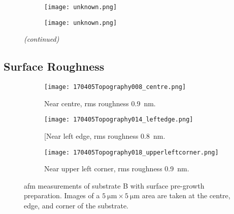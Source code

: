 \begin{figure}[htbp]
\ContinuedFloat
    \centering
    \begin{subfigure}[t]{\textwidth}
          \begin{minipage}[t]{0.49\linewidth}
            \centering
            \texttt{[image: unknown.png]}
          \end{minipage}
          \hspace{0.02\linewidth}
          \begin{minipage}[t]{0.49\linewidth}
            \centering
            \texttt{[image: unknown.png]}
          \end{minipage}
        \caption{}\label{fig:add_label}
    \end{subfigure}
    \captionsetup{list=no}
    \caption{\emph{(continued)}}
\end{figure}



\subsection{Surface Roughness}
\begin{figure}[htbp]
    \centering
    \begin{subfigure}[t]{\linewidth}
    \centering
        \texttt{[image: 170405Topography008\_centre.png]}
        \caption{Near centre, \ac{rms} roughness \SI{0.9}{\nano\metre}.}%
    \end{subfigure}%
    \par\bigskip
    \begin{subfigure}[t]{\linewidth}
    \centering
        \texttt{[image: 170405Topography014\_leftedge.png]}
        \caption{[Near left edge, \ac{rms} roughness \SI{0.8}{\nano\metre}.}%
    \end{subfigure}%
    \par\bigskip
    \begin{subfigure}[t]{\linewidth}
    \centering
        \texttt{[image: 170405Topography018\_upperleftcorner.png]}
        \caption{Near upper left corner, \ac{rms} roughness \SI{0.9}{\nano\metre}.} %
    \end{subfigure}%
    \caption[\Ac{afm} of substrate B with surface pre-growth preparation.]{\Acf{afm} measurements of substrate B with surface pre-growth preparation. Images of a $\SI{5}{\micro\metre}\times\SI{5}{\micro\metre}$ area are taken at the centre, edge, and corner of the substrate.}\label{fig:afm_subBb}
\end{figure} %

